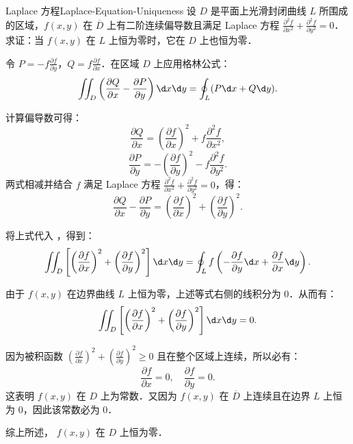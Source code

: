 \begin{problem}{Laplace 方程}{Laplace-Equation-Uniqueness}
    设 $D$ 是平面上光滑封闭曲线 $L$ 所围成的区域，$f(x,y)$ 在 $\overline{D}$ 上有二阶连续偏导数且满足 Laplace 方程 $\frac{\partial^2 f}{\partial x^2} + \frac{\partial^2 f}{\partial y^2} = 0$．求证：当 $f(x,y)$ 在 $L$ 上恒为零时，它在 $D$ 上也恒为零．
\end{problem}

\begin{myproof}
    令 $P = -f \frac{\partial f}{\partial y}$，$Q = f \frac{\partial f}{\partial x}$．在区域 $D$ 上应用格林公式：
    \begin{equation}\label{eq:green-identity}
        \iint_D \left( \frac{\partial Q}{\partial x} - \frac{\partial P}{\partial y} \right) \d x \d y = \oint_L (P \d x + Q \d y).
    \end{equation}

    计算偏导数可得：
    \begin{equation}
        \frac{\partial Q}{\partial x} = \left(\frac{\partial f}{\partial x}\right)^2 + f \frac{\partial^2 f}{\partial x^2},
    \end{equation}
    \begin{equation}
        \frac{\partial P}{\partial y} = -\left(\frac{\partial f}{\partial y}\right)^2 - f \frac{\partial^2 f}{\partial y^2}.
    \end{equation}
    两式相减并结合 $f$ 满足 Laplace 方程 $\frac{\partial^2 f}{\partial x^2} + \frac{\partial^2 f}{\partial y^2} = 0$，得：
    \begin{equation}
        \frac{\partial Q}{\partial x} - \frac{\partial P}{\partial y} = \left(\frac{\partial f}{\partial x}\right)^2 + \left(\frac{\partial f}{\partial y}\right)^2.
    \end{equation}

    将上式代入 ，得到：
    \begin{equation}
        \iint_D \left[ \left(\frac{\partial f}{\partial x}\right)^2 + \left(\frac{\partial f}{\partial y}\right)^2 \right] \d x \d y = \oint_L f \left( -\frac{\partial f}{\partial y} \d x + \frac{\partial f}{\partial x} \d y \right).
    \end{equation}

    由于 $f(x,y)$ 在边界曲线 $L$ 上恒为零，上述等式右侧的线积分为 $0$．从而有：
    \begin{equation}
        \iint_D \left[ \left(\frac{\partial f}{\partial x}\right)^2 + \left(\frac{\partial f}{\partial y}\right)^2 \right] \d x \d y = 0.
    \end{equation}

    因为被积函数 $\left(\frac{\partial f}{\partial x}\right)^2 + \left(\frac{\partial f}{\partial y}\right)^2 \ge 0$ 且在整个区域上连续，所以必有：
    \begin{equation}
        \frac{\partial f}{\partial x} = 0, \quad \frac{\partial f}{\partial y} = 0.
    \end{equation}
    这表明 $f(x,y)$ 在 $D$ 上为常数．又因为 $f(x,y)$ 在 $\overline{D}$ 上连续且在边界 $L$ 上恒为 $0$，因此该常数必为 $0$．

    综上所述， $f(x,y)$ 在 $D$ 上恒为零．
\end{myproof}

